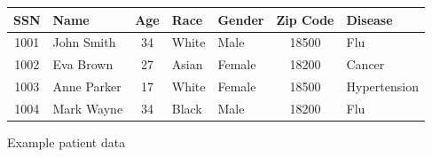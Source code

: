 \begin{figure}[H]
    \centering
    \begin{tabular}{c l c l l c l}
        \toprule
        \textbf{SSN} & \textbf{Name} & \textbf{Age} & \textbf{Race} & \textbf{Gender} & \textbf{Zip Code} & \textbf{Disease} \\
        \midrule
        1001 & John Smith  & 34 & White & Male   & 18500 & Flu \\
        1002 & Eva Brown   & 27 & Asian & Female & 18200 & Cancer \\
        1003 & Anne Parker & 17 & White & Female & 18500 & Hypertension \\
        1004 & Mark Wayne  & 34 & Black & Male   & 18200 & Flu \\
        \bottomrule
    \end{tabular}
    \caption{Example patient data}\label{fig:example-patient-data}
\end{figure}